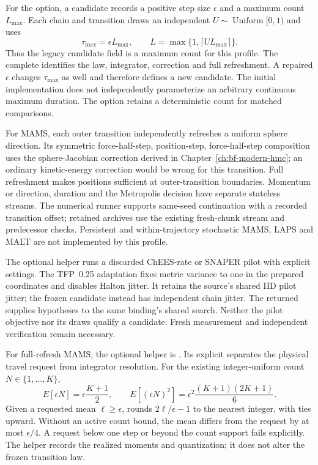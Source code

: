 For the  option, a candidate records a positive step
size $\epsilon$ and a maximum count $L_{\max}$. Each chain and transition draws
an independent $U\sim\operatorname{Uniform}[0,1)$ and uses
\[
  \tau_{\max}=\epsilon L_{\max},\qquad
  L=\max\{1,\lceil U L_{\max}\rceil\}.
\]
Thus the legacy candidate field  is a maximum count for
this profile. The complete  identifies the law,
integrator, correction and full refreshment. A repaired $\epsilon$ changes
$\tau_{\max}$ as well and therefore defines a new candidate. The initial
implementation does not independently parameterize an arbitrary continuous
maximum duration. The  option retains a deterministic count for
matched comparisons.

For MAMS, each outer transition independently refreshes a uniform sphere
direction. Its symmetric force-half-step, position-step, force-half-step
composition uses the sphere-Jacobian correction derived in
Chapter~\ref{ch:bf-modern-hmc}; an ordinary kinetic-energy correction
would be wrong for this transition. Full refreshment makes positions sufficient
at outer-transition boundaries. Momentum or direction, duration and the
Metropolis decision have separate stateless streams. The numerical runner
supports same-seed continuation with a recorded transition offset; retained
archives use the existing fresh-chunk stream and predecessor checks.
Persistent and within-trajectory stochastic MAMS, LAPS and MALT are not
implemented by this profile.

The optional  helper runs a discarded
ChEES-rate or SNAPER pilot with explicit  settings.
The TFP~0.25 adaptation fixes metric variance to one in the prepared coordinates
and disables Halton jitter. It retains the source's shared IID pilot jitter;
the frozen candidate instead has independent chain jitter. The returned
 supplies hypotheses to the same binding's shared search.
Neither the pilot objective nor its draws qualify a candidate. Fresh
measurement and independent verification remain necessary.

For full-refresh MAMS, the optional helper is
.
Its explicit  separates the physical travel request
from integrator resolution. For the existing integer-uniform count
$N\in\{1,\ldots,K\}$,
\[
 E[\epsilon N]=\epsilon\frac{K+1}{2},\qquad
 E[(\epsilon N)^2]=\epsilon^2\frac{(K+1)(2K+1)}{6}.
\]
Given a requested mean $\ell\geq\epsilon$,
 rounds $2\ell/\epsilon-1$ to the nearest integer,
with ties upward. Without an active count bound, the mean differs from the
request by at most $\epsilon/4$. A request below one step or beyond the count
support fails explicitly. The helper records the realized moments and
quantization; it does not alter the frozen transition law.

